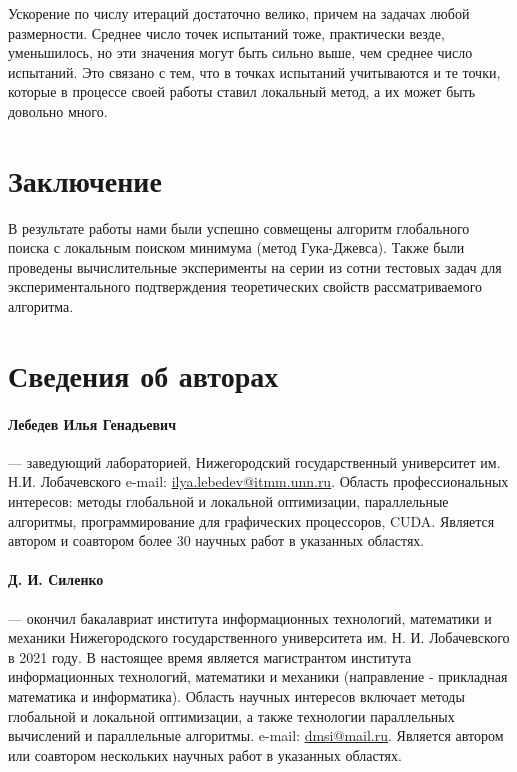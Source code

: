 \documentclass[12pt, a4paper, russian]{article}
\begin{document}
Ускорение по числу итераций достаточно велико, причем на задачах любой размерности. Среднее число точек испытаний тоже, практически везде, уменьшилось, но эти значения могут быть сильно выше, чем среднее число испытаний. Это связано с тем, что в точках испытаний учитываются и те точки, которые в процессе своей работы ставил локальный метод, а их может быть довольно много.


\section{Заключение}



В результате работы нами были успешно совмещены алгоритм глобального поиска с локальным поиском минимума (метод Гука-Джевса). Также были проведены вычислительные эксперименты на серии из сотни тестовых задач для экспериментального подтверждения теоретических свойств рассматриваемого алгоритма.

%
%
\renewcommand{\refname}{Список литературы}


\section*{Сведения об авторах}

\paragraph{Лебедев Илья Генадьевич} --- заведующий лабораторией, Нижегородский государственный университет им. Н.И. Лобачевского  e-mail: \url{ilya.lebedev@itmm.unn.ru}. Область профессиональных интересов: методы глобальной и локальной оптимизации, параллельные алгоритмы, программирование для графических процессоров, CUDA. Является автором и соавтором более 30 научных работ в указанных областях.

\paragraph{Д. И. Силенко} --- окончил бакалавриат института информационных технологий, математики и механики Нижегородского государственного университета им. Н. И. Лобачевского в 2021 году. В настоящее время является магистрантом института информационных технологий, математики и механики (направление - прикладная математика и информатика). Область научных интересов включает методы глобальной и локальной оптимизации, а также технологии параллельных вычислений и параллельные алгоритмы. e-mail: \url{dmsi@mail.ru}. Является автором или соавтором нескольких научных работ в указанных областях.
\end{document}
